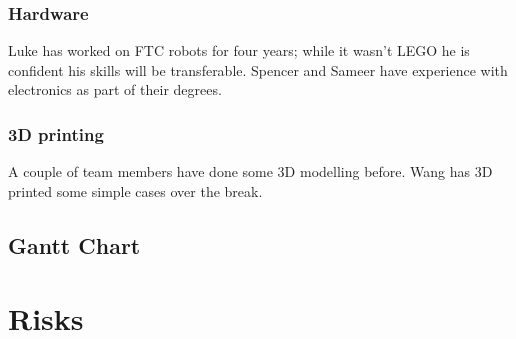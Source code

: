\documentclass[onecolumn]{IEEEtran}
\begin{document}
\subsubsection{Hardware}

Luke has worked on FTC robots for four years; while it wasn’t LEGO he is confident his skills will be transferable. Spencer and Sameer have experience with electronics as part of their degrees.

\subsubsection{3D printing}

A couple of team members have done some 3D modelling before. Wang has 3D printed some simple cases over the break.

\subsection{Gantt Chart}


\section{Risks}
\end{document}
